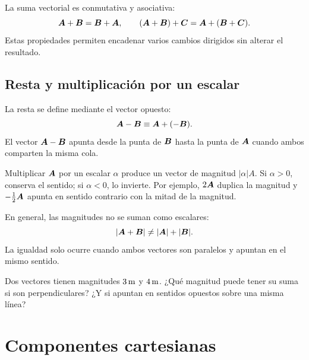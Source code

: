 \documentclass[11pt]{article}
\begin{document}
\begin{center}
\end{center}

La suma vectorial es conmutativa y asociativa:
\[
  \boldsymbol{A}+\boldsymbol{B}=\boldsymbol{B}+\boldsymbol{A},
  \qquad
  (\boldsymbol{A}+\boldsymbol{B})+\boldsymbol{C}
  =
  \boldsymbol{A}+(\boldsymbol{B}+\boldsymbol{C}).
\]
Estas propiedades permiten encadenar varios cambios dirigidos sin alterar el
resultado.

\subsection{Resta y multiplicación por un escalar}

La resta se define mediante el vector opuesto:
\[
  \boldsymbol{A}-\boldsymbol{B}
  \equiv
  \boldsymbol{A}+(-\boldsymbol{B}).
\]
El vector \(\boldsymbol{A}-\boldsymbol{B}\) apunta desde la punta de \(\boldsymbol{B}\) hasta la
punta de \(\boldsymbol{A}\) cuando ambos comparten la misma cola.

Multiplicar \(\boldsymbol{A}\) por un escalar \(\alpha\) produce un vector de
magnitud \(|\alpha|A\). Si \(\alpha>0\), conserva el sentido; si
\(\alpha<0\), lo invierte. Por ejemplo, \(2\boldsymbol{A}\) duplica la magnitud y
\(-\tfrac12\boldsymbol{A}\) apunta en sentido contrario con la mitad de la magnitud.

En general, las magnitudes no se suman como escalares:
\[
  |\boldsymbol{A}+\boldsymbol{B}|
  \neq
  |\boldsymbol{A}|+|\boldsymbol{B}|.
\]
La igualdad solo ocurre cuando ambos vectores son paralelos y apuntan en el
mismo sentido.

\begin{pregunta}
Dos vectores tienen magnitudes \(3\,\mathrm{m}\) y \(4\,\mathrm{m}\).
¿Qué magnitud puede tener su suma si son perpendiculares? ¿Y si apuntan en
sentidos opuestos sobre una misma línea?
\end{pregunta}

\section{Componentes cartesianas}
\end{document}
